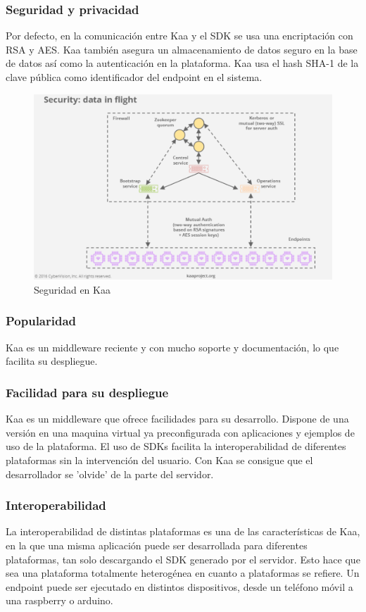 \documentclass[12pt, twoside]{book}
\begin{document}
\subsubsection*{Seguridad y privacidad}
Por defecto, en la comunicación entre Kaa y el SDK se usa una encriptación con RSA y AES. Kaa también asegura un almacenamiento de datos seguro en la base de datos así como la autenticación en la plataforma. Kaa usa el hash SHA-1 de la clave pública como identificador del endpoint en el sistema.
\begin{figure}[H]
\centering
\includegraphics[scale=0.5]{images/security_capture}
\caption{Seguridad en Kaa}\label{L510}
\end{figure} 
\subsubsection*{Popularidad}
Kaa es un middleware reciente y con mucho soporte y documentación, lo que facilita su despliegue.
\subsubsection*{Facilidad para su despliegue} 
Kaa es un middleware que ofrece facilidades para su desarrollo. Dispone de una versión en una maquina virtual ya preconfigurada con aplicaciones y ejemplos de uso de la plataforma. El uso de SDKs facilita la interoperabilidad de diferentes plataformas sin la intervención del usuario. Con Kaa se consigue que el desarrollador se 'olvide' de la parte del servidor. 

\subsubsection*{Interoperabilidad}
La interoperabilidad de distintas plataformas es una de las características de Kaa, en la que una misma aplicación puede ser desarrollada para diferentes plataformas, tan solo descargando el SDK generado por el servidor. Esto hace que sea una plataforma totalmente heterogénea en cuanto a plataformas se refiere. Un endpoint puede ser ejecutado en distintos dispositivos, desde un teléfono móvil a una raspberry o arduino.
\end{document}
